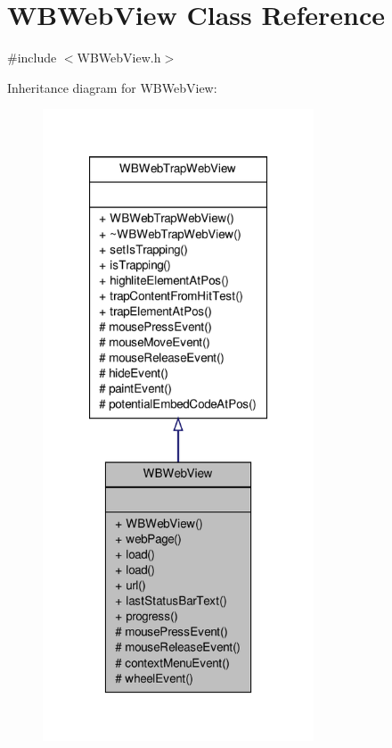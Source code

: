 \hypertarget{class_w_b_web_view}{\section{W\-B\-Web\-View Class Reference}
\label{d1/da6/class_w_b_web_view}
}


{\ttfamily \#include $<$W\-B\-Web\-View.\-h$>$}



Inheritance diagram for W\-B\-Web\-View\-:
\nopagebreak
\begin{figure}[H]
\begin{center}
\leavevmode
\includegraphics[width=228pt]{d3/dba/class_w_b_web_view__inherit__graph}
\end{center}
\end{figure}


